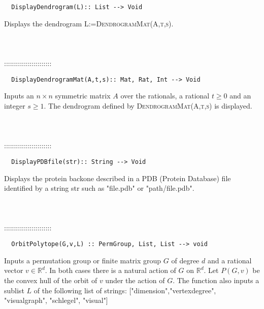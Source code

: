 \documentclass[a4paper,11pt]{report}
\begin{document}
{\begin{verbatim}  DisplayDendrogram(L):: List --> Void
\end{verbatim}


 

 Displays the dendrogram \textsc{L:=DendrogramMat(A,t,s)}. \\
 \\
 \\
 \\
 ::::::::::::::::::::::::\\
 
\begin{verbatim}  DisplayDendrogramMat(A,t,s):: Mat, Rat, Int --> Void
\end{verbatim}


 

 Inputs an $n\times n$ symmetric matrix $A$ over the rationals, a rational $t \ge 0$ and an integer $s \ge 1$. The dendrogram defined by \textsc{DendrogramMat(A,t,s)} is displayed. \\
 \\
 \\
 \\
 ::::::::::::::::::::::::\\
 
\begin{verbatim}  DisplayPDBfile(str):: String --> Void
\end{verbatim}


 

 Displays the protein backone described in a PDB (Protein Database) file
identified by a string str such as "file.pdb" or "path/file.pdb". \\
 \\
 \\
 \\
 ::::::::::::::::::::::::\\
 
\begin{verbatim}  OrbitPolytope(G,v,L) :: PermGroup, List, List --> void
\end{verbatim}


 

Inputs a permutation group or finite matrix group $G$ of degree $d$ and a rational vector $v\in \mathbb R^d$. In both cases there is a natural action of $G$ on $\mathbb R^d$. Let $P(G,v)$ be the convex hull of the orbit of $v$ under the action of $G$. The function also inputs a sublist $L$ of the following list of strings:
["dimension","vertex\texttt{}{\textunderscore}degree",
"visual\texttt{}{\textunderscore}graph", "schlegel", "visual"] 

}
\end{document}

